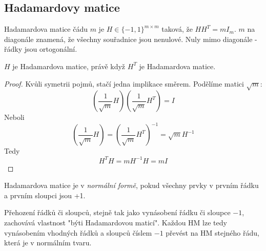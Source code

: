 \subsection{Hadamardovy matice}

\begin{definition}
    Hadamardova matice čádu $m$ je $H\in\{-1,1\}^{m\times m}$ taková, že $HH^T=mI_m$.
    $m$ na diagonále znamená, že všechny souřadnice jsou nenulové.
    Nuly mimo diagonále - řádky jsou ortogonální.
\end{definition}
\begin{lemma}
    $H$ je Hadamardova matice, právě když $H^T$ je Hadamardova matice.
\end{lemma}
\begin{proof}
	Kvůli symetrii pojmů, stačí jedna implikace směrem.
	Podělíme matici $\sqrt{m}$:
	\[ \left(\frac{1}{\sqrt{m}} H \right) \left(\frac{1}{\sqrt{m}} H^T \right) = I \]
	Neboli
	\[ \left(\frac{1}{\sqrt{m}} H \right) = \left(\frac{1}{\sqrt{m}} H^T \right)^{-1} = \sqrt{m}H^{-1} \]
	Tedy
	\[ H^T H = m H^{-1}H = mI \]
\end{proof}

\begin{definition}
	Hadamardova matice je v \emph{normální formě}, pokud všechny prvky v prvním řádku a prvním sloupci jsou +1.
\end{definition}

\begin{observation}[Uzavřenost HM]\label{hm_close}
	Přehození řádků či sloupců, stejně tak jako vynásobení řádku či sloupce $-1$, zachovává vlastnost "býti Hadamardovou maticí".
	Každou HM lze tedy vynásobením vhodných řádků a sloupců číslem $-1$ převést na HM stejného řádu, která je v normálním tvaru.
\end{observation}

